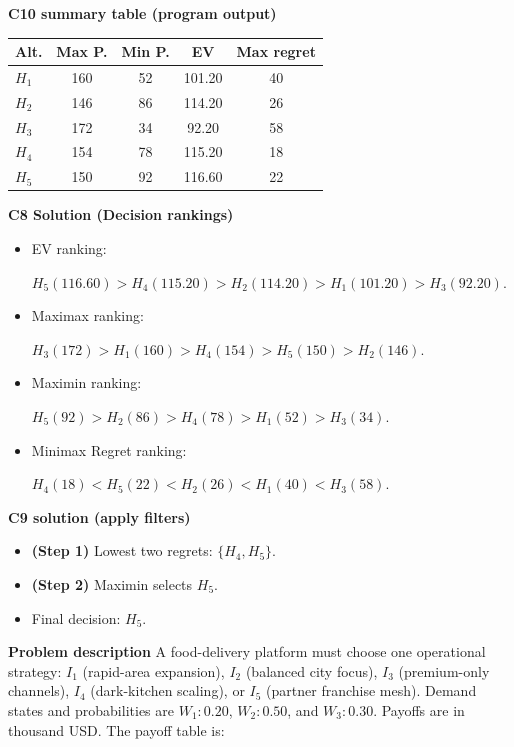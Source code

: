\begin{ExamProblems}
		\textbf{C10 summary table (program output)}\par
		\begin{center}
			\begin{tabular}{l c c c c}
				\hline
				Alt. & Max P. & Min P. & EV & Max regret \\
				\hline
				$H_1$ & 160 & 52 & 101.20 & 40 \\
				$H_2$ & 146 & 86 & 114.20 & 26 \\
				$H_3$ & 172 & 34 & 92.20 & 58 \\
				$H_4$ & 154 & 78 & 115.20 & 18 \\
				$H_5$ & 150 & 92 & 116.60 & 22 \\
				\hline
			\end{tabular}
		\end{center}
		
		\textbf{C8 Solution (Decision rankings)}\par
		\begin{itemize}
			\item EV ranking: \par $H_5(116.60)>H_4(115.20)>H_2(114.20)>H_1(101.20)>H_3(92.20)$.
			\item Maximax ranking:\par $H_3(172)>H_1(160)>H_4(154)>H_5(150)>H_2(146)$.
			\item Maximin ranking: \par $H_5(92)>H_2(86)>H_4(78)>H_1(52)>H_3(34)$.
			\item Minimax Regret ranking:\par $H_4(18)<H_5(22)<H_2(26)<H_1(40)<H_3(58)$.
		\end{itemize}
		
		\textbf{C9 solution (apply filters)}\par
		\begin{itemize}
			\item \textbf{(Step 1)} Lowest two regrets: $\{H_4,H_5\}$.
			\item \textbf{(Step 2)} Maximin selects $H_5$.
			\item Final decision: $H_5$.
		\end{itemize}
		
		\newpage
		\item
		\textbf{Problem description}
		A food-delivery platform must choose one operational strategy: $I_1$ (rapid-area expansion), $I_2$ (balanced city focus), $I_3$ (premium-only channels), $I_4$ (dark-kitchen scaling), or $I_5$ (partner franchise mesh).
		Demand states and probabilities are $W_1:0.20$, $W_2:0.50$, and $W_3:0.30$. Payoffs are in thousand USD. The payoff table is:
		

\end{ExamProblems}
